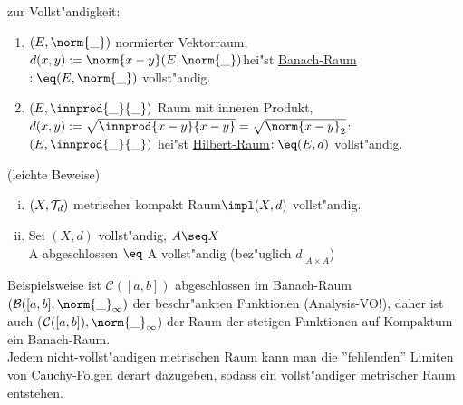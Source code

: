 \begin{beispiel}\label{8.5} zur Vollst"andigkeit:
\begin{enumerate}
\item $(E,\norm{\_})$ normierter Vektorraum, $d(x,y):=\norm{x-y}\\
(E,\norm{\_})$hei"st \ul{{\sc Banach}-Raum}$:\eq (E,\norm{\_})$ vollst"andig.
\item $(E,\innprod{\_}{\_})$ Raum mit inneren Produkt, $d(x,y):=\sqrt{\innprod{x-y}{x-y}}=\sqrt{\norm{x-y}_2}$:\\
$(E,\innprod{\_}{\_})$ hei"st \ul{{\sc Hilbert}-Raum}$:\eq (E,d)$ vollst"andig.
\end{enumerate}
\end{beispiel}

\begin{beob}\label{8.6} (leichte Beweise)
\begin{enumerate}[(i)]
\item $(X,\mathcal T_d)$ metrischer kompakt Raum$\impl (X, d)$ vollst"andig.
\item Sei $(X,d)$ vollst"andig, $A\seq X$\\
A abgeschlossen $\eq$ A vollst"andig (bez"uglich $d|_{A\times A}$)
\end{enumerate}
\end{beob}
Beispielsweise ist $\mathcal{C} ([a,b])$ abgeschlossen im {\sc Banach}-Raum $(\mathcal{B}([a,b],\norm{\_}_\infty )$ der beschr"ankten Funktionen (Analysis-VO!), daher ist auch ($\mathcal{C}([a,b]),\norm{\_}_\infty$) der Raum der stetigen Funktionen auf Kompaktum ein {\sc Banach}-Raum.\vspace*{0.3cm}\\
Jedem nicht-vollst"andigen metrischen Raum kann man die ''fehlenden'' Limiten von Cauchy-Folgen derart dazugeben, sodass ein vollst"andiger metrischer Raum entstehen.

